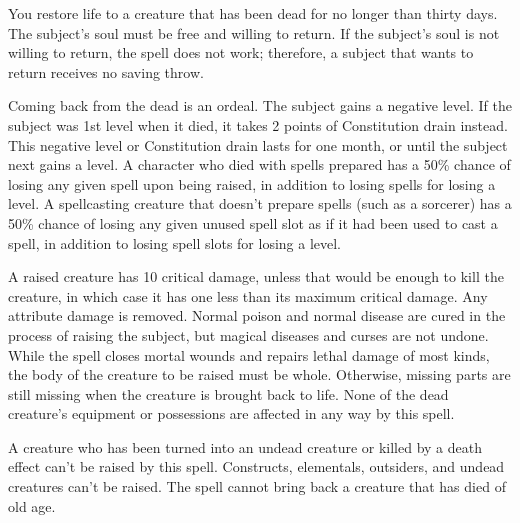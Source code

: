 \begin{spelleffect}
You restore life to a creature that has been dead for no longer than thirty days. The subject's soul must be free and willing to return. If the subject's soul is not willing to return, the spell does not work; therefore, a subject that wants to return receives no saving throw.
\par Coming back from the dead is an ordeal. The subject gains a negative level. If the subject was 1st level when it died, it takes 2 points of Constitution drain instead. This negative level or Constitution drain lasts for one month, or until the subject next gains a level. A character who died with spells prepared has a 50\% chance of losing any given spell upon being raised, in addition to losing spells for losing a level. A spellcasting creature that doesn't prepare spells (such as a sorcerer) has a 50\% chance of losing any given unused spell slot as if it had been used to cast a spell, in addition to losing spell slots for losing a level.
\par A raised creature has 10 critical damage, unless that would be enough to kill the creature, in which case it has one less than its maximum critical damage. Any attribute damage is removed. Normal poison and normal disease are cured in the process of raising the subject, but magical diseases and curses are not undone. While the spell closes mortal wounds and repairs lethal damage of most kinds, the body of the creature to be raised must be whole. Otherwise, missing parts are still missing when the creature is brought back to life. None of the dead creature's equipment or possessions are affected in any way by this spell.
\end{spelleffect}
\begin{spellnotes}
A creature who has been turned into an undead creature or killed by a death effect can't be raised by this spell. Constructs, elementals, outsiders, and undead creatures can't be raised. The spell cannot bring back a creature that has died of old age.
\end{spellnotes}

